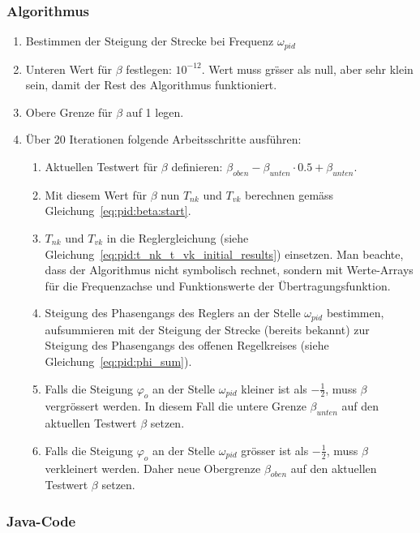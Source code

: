 \subsubsection*{Algorithmus}
\begin{enumerate}
        \item
            Bestimmen der Steigung der Strecke bei Frequenz $\omega_{pid}$
        \item
            Unteren  Wert   f\"ur  $\beta$   festlegen: $10^{-12}$. Wert  muss
            gr\"sser  als null,  aber  sehr  klein sein,  damit  der Rest  des
            Algorithmus funktioniert.
        \item
            Obere Grenze f\"ur $\beta$ auf 1 legen.
        \item
            \"Uber 20 Iterationen folgende Arbeitsschritte ausf\"uhren:
            \begin{enumerate}
                \item
                    Aktuellen Testwert f\"ur $\beta$ definieren: $\beta_{oben}
                    - \beta_{unten} \cdot 0.5 + \beta_{unten}$.
                \item
                    Mit diesem  Wert f\"ur  $\beta$ nun $T_{nk}$  und $T_{vk}$
                    berechnen gem\"ass Gleichung~\ref{eq:pid:beta:start}.
                \item
                    $T_{nk}$  und  $T_{vk}$   in  die  Reglergleichung  (siehe
                    Gleichung~\ref{eq:pid:t_nk_t_vk_initial_results}) einsetzen.
                    Man  beachte,   dass  der  Algorithmus   nicht  symbolisch
                    rechnet, sondern mit  Werte-Arrays f\"ur die Frequenzachse
                    und Funktionswerte der \"Ubertragungsfunktion.
                \item
                    Steigung    des   Phasengangs    des   Reglers    an   der
                    Stelle  $\omega_{pid}$  bestimmen,  aufsummieren  mit  der
                    Steigung  der  Strecke   (bereits  bekannt)  zur  Steigung
                    des   Phasengangs   des    offenen   Regelkreises   (siehe
                    Gleichung~\ref{eq:pid:phi_sum}).
                \item
                    Falls   die    Steigung   $\varphi_o$   an    der   Stelle
                    $\omega_{pid}$  kleiner   ist  als   $-\frac{1}{2}$,  muss
                    $\beta$ vergr\"ossert  werden.  In diesem Fall  die untere
                    Grenze $\beta_{unten}$ auf  den aktuellen Testwert $\beta$
                    setzen.
                \item
                    Falls   die    Steigung   $\varphi_o$   an    der   Stelle
                    $\omega_{pid}$  gr\"osser  ist  als  $-\frac{1}{2}$,  muss
                    $\beta$   verkleinert    werden. Daher   neue   Obergrenze
                    $\beta_{oben}$ auf den aktuellen Testwert $\beta$ setzen.
            \end{enumerate}
\end{enumerate}

\subsubsection*{Java-Code}

